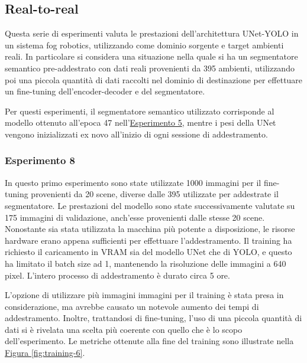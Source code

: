 \documentclass[12pt]{report}
\begin{document}
\subsection{Real-to-real}
\label{sec:real_to_real_fr}

Questa serie di esperimenti valuta le prestazioni dell'architettura UNet-YOLO in un sistema fog robotics, utilizzando come dominio sorgente e target ambienti reali. In particolare si considera una situazione nella quale si ha un segmentatore semantico pre-addestrato con dati reali provenienti da 395 ambienti, utilizzando poi una piccola quantità di dati raccolti nel dominio di destinazione per effettuare un fine-tuning dell'encoder-decoder e del segmentatore.

Per questi esperimenti, il segmentatore semantico utilizzato corrisponde al modello ottenuto all’epoca 47 nell'\hyperref[sec:esperimento_5]{Esperimento 5}, mentre i pesi della UNet vengono inizializzati ex novo all'inizio di ogni sessione di addestramento.

\subsubsection{Esperimento 8}
\label{sec:esperimento_8}

In questo primo esperimento sono state utilizzate 1000 immagini per il fine-tuning provenienti da 20 scene, diverse dalle 395 utilizzate per addestrate il segmentatore. Le prestazioni del modello sono state successivamente valutate su 175 immagini di validazione, anch'esse provenienti dalle stesse 20 scene. Nonostante sia stata utilizzata la macchina più potente a disposizione, le risorse hardware erano appena sufficienti per effettuare l'addestramento. Il training ha richiesto il caricamento in VRAM sia del modello UNet che di YOLO, e questo ha limitato il batch size ad 1, mantenendo la risoluzione delle immagini a 640 pixel. L'intero processo di addestramento è durato circa 5 ore.

L'opzione di utilizzare più immagini immagini per il training è stata presa in considerazione, ma avrebbe causato un notevole aumento dei tempi di addestramento. Inoltre, trattandosi di fine-tuning, l'uso di una piccola quantità di dati si è rivelata una scelta più coerente con quello che è lo scopo dell'esperimento. Le metriche ottenute alla fine del training sono illustrate nella \hyperref[fig:training-6]{Figura \ref{fig:training-6}}.
\end{document}
